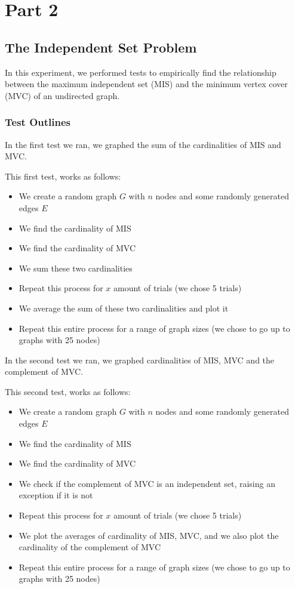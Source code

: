 \documentclass[12pt]{article}
\begin{document}
\section{Part 2}
\subsection{The Independent Set Problem}
In this experiment, we performed tests to empirically find the relationship between the maximum 
independent set (MIS) and the minimum vertex cover (MVC) of an undirected graph.

\subsubsection{Test Outlines}

In the first test we ran, we graphed the sum of the cardinalities of MIS and MVC.

This first test, works as follows:

\begin{itemize}
    \item We create a random graph $G$ with $n$ nodes and some randomly generated edges $E$
    \item We find the cardinality of MIS
    \item We find the cardinality of MVC
    \item We sum these two cardinalities 
    \item Repeat this process for $x$ amount of trials (we chose 5 trials)
    \item We average the sum of these two cardinalities and plot it 
    \item Repeat this entire process for a range of graph sizes (we chose to go up to graphs with 25 nodes)
\end{itemize}

In the second test we ran, we graphed cardinalities of MIS, MVC and the complement of MVC.

This second test, works as follows:

\begin{itemize}
    \item We create a random graph $G$ with $n$ nodes and some randomly generated edges $E$
    \item We find the cardinality of MIS
    \item We find the cardinality of MVC
    \item We check if the complement of MVC is an independent set, raising an exception if it is not
    \item Repeat this process for $x$ amount of trials (we chose 5 trials)
    \item We plot the averages of cardinality of MIS, MVC, and we also plot the cardinality of the complement of MVC
    \item Repeat this entire process for a range of graph sizes (we chose to go up to graphs with 25 nodes)
\end{itemize}
\end{document}
